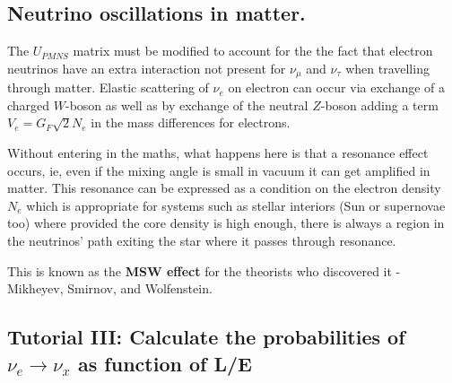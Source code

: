\documentclass[
  letterpaper,
  DIV=11,
  numbers=noendperiod]{scrreprt}
\begin{document}
\subsection{Neutrino oscillations in
matter.}\label{neutrino-oscillations-in-matter.}

The \(U_{PMNS}\) matrix must be modified to account for the the fact
that electron neutrinos have an extra interaction not present for
\(\nu_\mu\) and \(\nu_\tau\) when travelling through matter. Elastic
scattering of \(\nu_e\) on electron can occur via exchange of a charged
\(W\)-boson as well as by exchange of the neutral \(Z\)-boson adding a
term \(V_e = G_F \sqrt{2}N_e\) in the mass differences for electrons.

Without entering in the maths, what happens here is that a resonance
effect occurs, ie, even if the mixing angle is small in vacuum it can
get amplified in matter. This resonance can be expressed as a condition
on the electron density \(N_e\) which is appropriate for systems such as
stellar interiors (Sun or supernovae too) where provided the core
density is high enough, there is always a region in the neutrinos' path
exiting the star where it passes through resonance.

This is known as the \textbf{MSW effect} for the theorists who
discovered it - Mikheyev, Smirnov, and Wolfenstein.

\subsection{\texorpdfstring{Tutorial III: Calculate the probabilities of
\(\nu_e \rightarrow \nu_x\) as function of
L/E}{Tutorial III: Calculate the probabilities of \textbackslash nu\_e \textbackslash rightarrow \textbackslash nu\_x as function of L/E}}\label{tutorial-iii-calculate-the-probabilities-of-nu_e-rightarrow-nu_x-as-function-of-le}
\end{document}
